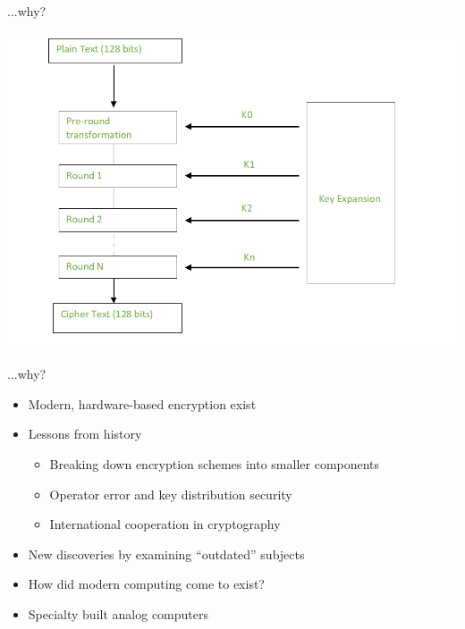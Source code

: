 \documentclass[hyphens,aspectratio=169]{beamer}
\begin{document}
\begin{frame}[fragile]{...why?}
\begin{center}
    \includegraphics[scale=0.3]{paper/images/aes.png}
\end{center}
\end{frame}

\begin{frame}[fragile]{...why?}
\begin{itemize}
    \item  Modern, hardware-based encryption exist
    \vspace{1em}
        \item Lessons from history
        \begin{itemize}
            \item Breaking down encryption schemes into smaller components
            \item Operator error and key distribution security 
            \item International cooperation in cryptography
        \end{itemize}
    \vspace{1em}
        \item New discoveries by examining ``outdated'' subjects
    \vspace{1em}
    \pause
    \item How did modern computing come to exist?
        \vspace{1em}
    \pause
    \item Specialty built analog computers
\end{itemize}
\end{frame}
\end{document}
